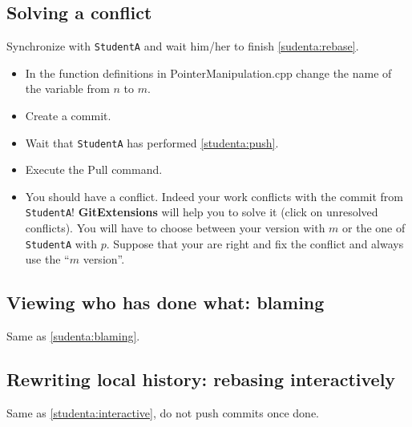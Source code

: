 \documentclass[11pt,amsfonts,amsmath]{article}
\begin{document}
\subsection{Solving a conflict}
Synchronize with \texttt{StudentA} and wait him/her to finish \ref{sudenta:rebase}.\\
\begin{itemize}
\item In the function definitions in PointerManipulation.cpp change the name of the variable from $n$ to $m$.
\item Create a commit.
\item Wait that \texttt{StudentA} has performed \ref{studenta:push}.
\item Execute the Pull command.
\item You should have a conflict. Indeed your work conflicts with the commit from \texttt{StudentA}! \textbf{GitExtensions} will help you to solve it (click on unresolved conflicts). You will have to choose between your version with $m$ or the one of \texttt{StudentA} with $p$. Suppose that your are right and fix the conflict and always use the ``$m$ version''.
\end{itemize}

\subsection{Viewing who has done what: blaming}
Same as \ref{sudenta:blaming}.

\subsection{Rewriting local history: rebasing interactively}
Same as \ref{studenta:interactive}, do not push commits once done.
\end{document}
